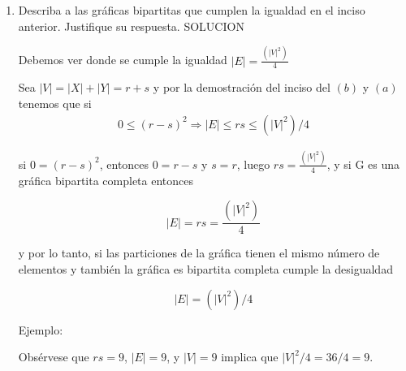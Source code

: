 \documentclass{article}
\begin{document}
\begin{enumerate}
\begin{enumerate}
\begin{proof}
    \end{proof}
    
  \item Describa a las gr\'aficas bipartitas que cumplen la igualdad en el
    inciso anterior. Justifique su respuesta.
    SOLUCION

    Debemos ver donde se cumple la igualdad $|E|= \frac{(|V|^2)}{4}$

    Sea $|V|= |X| + |Y| = r+s$ y por la demostración del inciso del $(b)$ y $(a)$
    tenemos que si
    \begin{eqnarray*}
      0\leqslant(r-s)^2 \Longrightarrow |E|\leqslant rs \leqslant (|V|^2)/4 
    \end{eqnarray*}
    
    
     si $0=(r-s)^2$, entonces $0=r-s$ y $s=r$, luego $rs= \frac{(|V|^2)}{4}$,
     y si G es una gráfica bipartita completa entonces

     \[
     |E|=rs=\frac{(|V|^2)}{4}
     \]

     y por lo tanto, si las particiones de la gráfica tienen el mismo número de
     elementos y también la gráfica es bipartita completa cumple la desigualdad

     \[
     |E|= (|V|^2)/4
     \]

    Ejemplo:
    \begin{center}
    \begin{figure}[ht!]                                                             
      \centering
    \end{figure}
    \end{center}
    
    Obsérvese que $rs=9$, $|E|=9$, y $|V| = 9$ implica que $|V|^2/4 = 36/4 = 9$.
  \end{enumerate}
\end{enumerate}
\end{document}
